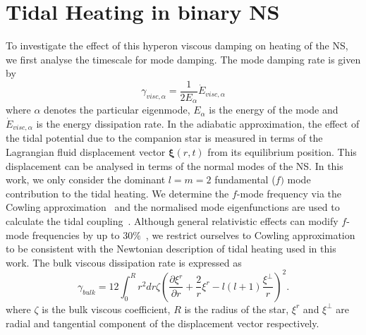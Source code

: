 \documentclass[%
 reprint,
 amsmath,amssymb,
 aps,
]{revtex4-2}
\begin{document}
\section{Tidal Heating in binary NS}
\label{sec:TH_NS}
To investigate the effect of this hyperon viscous damping on heating of the NS, we first analyse the timescale for mode damping. The mode damping rate is given by
\begin{equation}\label{eq:damptime2}
    \gamma_{visc,\alpha} = \frac{1}{2E_{\alpha}}\Dot{E}_{visc,\alpha}
\end{equation}
where $\alpha$ denotes the particular eigenmode, $E_{\alpha}$ is the energy of the mode and $\Dot{E}_{visc,\alpha}$ is the energy dissipation rate. In the adiabatic approximation, the effect of the tidal potential due to the companion star is measured in terms of the Lagrangian fluid displacement vector $\bm{\xi}(r,t)$ from its equilibrium position. This displacement can be analysed in terms of the normal modes of the NS.  In this work, we  only consider the dominant $ l = m = 2$ fundamental ($f)$ mode contribution to the tidal heating. We determine the $f$-mode frequency via the Cowling approximation~\cite{Pradhan_2021} and the normalised mode eigenfunctions are used to calculate the tidal coupling~\cite{Andersson_2018}. Although general relativistic effects can modify $f$-mode frequencies by up to $30\%$~\cite{Pradhan_fullGR}, we restrict ourselves to Cowling approximation to be consistent with the Newtonian description of  tidal heating used in this work. The bulk viscous dissipation rate is expressed as~\cite{Lai_1994} 
\begin{equation}\label{eq:gammabulk}
    \gamma_{bulk} = 12\int_0^R r^2dr\zeta \left(\frac{\partial \xi^r}{\partial r} + \frac{2}{r}\xi^r - l(l+1)\frac{\xi^{\perp}}{r}\right)^2 .
\end{equation}
where  $\zeta$ is the bulk viscous coefficient, $R$ is the radius of the star, $\xi^r$ and $\xi^{\perp}$ are radial and tangential component of the displacement vector respectively. \\
 
\end{document}
